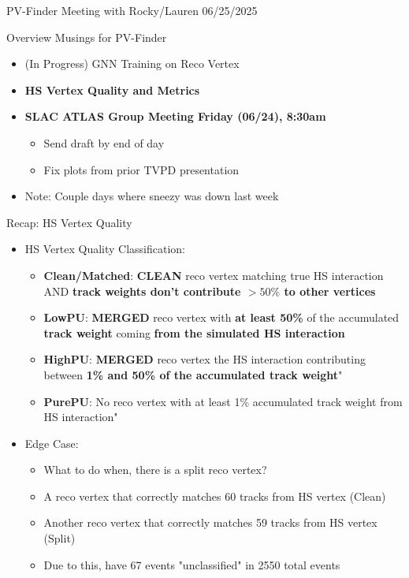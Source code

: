 \documentclass[xcolor=table,aspectratio=169]{beamer}
\begin{document}
\begin{frame}[plain]
    \centering
    PV-Finder Meeting with Rocky/Lauren 06/25/2025
\end{frame}


\begin{frame}{Overview Musings for PV-Finder}
    \begin{itemize}
        \item (In Progress) GNN Training on Reco Vertex
        \item \textbf{HS Vertex Quality and Metrics}
        \item \textbf{SLAC ATLAS Group Meeting Friday (06/24), 8:30am}
        \begin{itemize}
            \item Send draft by end of day
            \item Fix plots from prior TVPD presentation
        \end{itemize}
        \item Note: Couple days where sneezy was down last week
    \end{itemize}
\end{frame}

\begin{frame}{Recap: HS Vertex Quality}
    \begin{itemize}
        \item HS Vertex Quality Classification:
        \begin{itemize}
            \item \textbf{Clean/Matched}: \textbf{CLEAN} reco vertex matching true HS interaction AND \textbf{track weights don't contribute \(> 50 \%\) to other vertices}
            \item \textbf{LowPU}: \textbf{MERGED} reco vertex with \textbf{at least 50\%} of the accumulated \textbf{track weight} coming \textbf{from the simulated HS interaction}
            \item \textbf{HighPU}: \textbf{MERGED} reco vertex the HS interaction contributing between \textbf{1\% and 50\% of the accumulated track weight}"
            \item \textbf{PurePU}: No reco vertex with at least 1\% accumulated track weight from HS interaction"
        \end{itemize}
        \item Edge Case:
        \begin{itemize}
            \item What to do when, there is a split reco vertex?
            \item A reco vertex that correctly matches 60 tracks from HS vertex (Clean)
            \item Another reco vertex that correctly matches 59 tracks from HS vertex (Split)
            \item Due to this, have 67 events "unclassified" in 2550 total events
        \end{itemize}
    \end{itemize}
\end{frame}
\end{document}
